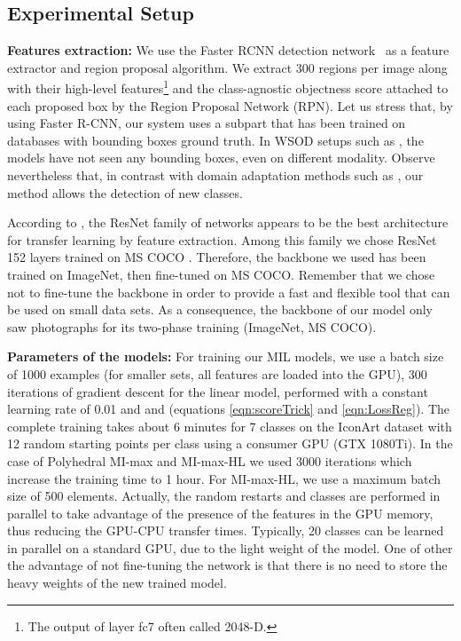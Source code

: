 \documentclass[preprint]{elsarticle}
\newcommand\mimaxaddlayerS{MI-max-HL}
\newcommand\MaxOfMaxS{Polyhedral MI-max}
\begin{document}
\subsection{Experimental Setup}

{\bf Features extraction:}
We use the Faster RCNN  detection network~\citep{ren_faster_2015} as a feature extractor and region proposal algorithm. We extract 300 regions per image along with their high-level features\footnote{The output of layer fc7 often called 2048-D.} and the class-agnostic objectness score attached to each proposed box by the Region Proposal Network (RPN). Let us stress that, by using Faster R-CNN, our system uses a subpart that has been trained on databases with bounding boxes ground truth. In WSOD setups such as \citep{bilen_weakly_2016,zhu_soft_2017,tang_pcl_2018}, the models have not seen any bounding boxes, even on different modality. Observe nevertheless that, in contrast with domain adaptation methods such as \citep{inoue_crossdomain_2018}, our method allows the detection of new classes. 






According to \cite{kornblith_better_2018}, the ResNet family of networks appears to be the best architecture for transfer learning by feature extraction. Among this family we chose ResNet 152 layers trained on MS COCO \citep{lin_microsoft_2014}. Therefore, the backbone we used has been trained on ImageNet, then fine-tuned on MS COCO. Remember that we chose not to fine-tune the backbone in order to provide a fast and flexible tool that can be used on small data sets. As a consequence, the backbone of our model only saw photographs for its two-phase training (ImageNet, MS COCO).





{\bf Parameters of the models:} For training our MIL models, we use a batch size of 1000 examples (for smaller sets, all features are loaded into the GPU), 300 iterations of gradient descent for the linear model, performed with a constant learning rate of 0.01 and   and   (equations \eqref{eqn:scoreTrick} and \eqref{eqn:LossReg}). The complete training takes about 6 minutes for 7 classes on the IconArt dataset \citep{gonthier_weakly_2018} with 12 random starting points per class using a consumer GPU (GTX 1080Ti).  In the case of  \MaxOfMaxS{} and \mimaxaddlayerS{} we used 3000 iterations which increase the training time to 1 hour. For \mimaxaddlayerS{}, we use a maximum batch size of 500 elements.
Actually, the random restarts and classes are performed in parallel to take advantage of the presence of the features in the GPU memory, thus reducing the GPU-CPU transfer times. Typically, 20 classes can be learned in parallel on a standard GPU, due to the light weight of the model. One of other the advantage of not fine-tuning the network is that there is no need to store the heavy weights of the new trained model.
\end{document}
